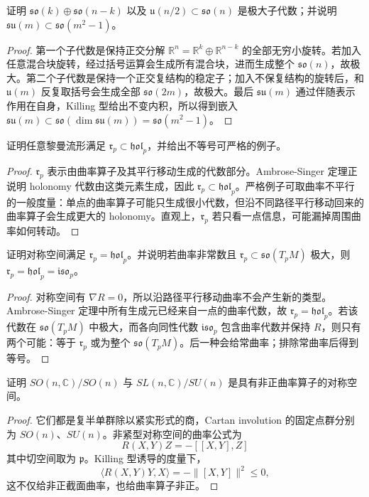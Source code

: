 \documentclass[11pt,a4paper,openany]{ctexbook}
\numberwithin{equation}{chapter}
\begin{document}
\begin{exercise}
证明 \(\mathfrak{so}(k)\oplus\mathfrak{so}(n-k)\) 以及 \(\mathfrak u(n/2)\subset\mathfrak{so}(n)\) 是极大子代数；并说明 \(\mathfrak{su}(m)\subset\mathfrak{so}(m^2-1)\)。
\end{exercise}
\begin{proof}
第一个子代数是保持正交分解 \(\mathbb R^n=\mathbb R^k\oplus\mathbb R^{n-k}\) 的全部无穷小旋转。若加入任意混合块旋转，经过括号运算会生成所有混合块，进而生成整个 \(\mathfrak{so}(n)\)，故极大。第二个子代数是保持一个正交复结构的稳定子；加入不保复结构的旋转后，和 \(\mathfrak u(m)\) 反复取括号会生成全部 \(\mathfrak{so}(2m)\)，故极大。最后 \(\mathfrak{su}(m)\) 通过伴随表示作用在自身，Killing 型给出不变内积，所以得到嵌入 \(\mathfrak{su}(m)\subset\mathfrak{so}(\dim\mathfrak{su}(m))=\mathfrak{so}(m^2-1)\)。
\end{proof}

\begin{exercise}
证明任意黎曼流形满足 \(\mathfrak r_p\subset\mathfrak{hol}_p\)，并给出不等号可严格的例子。
\end{exercise}
\begin{proof}
\(\mathfrak r_p\) 表示由曲率算子及其平行移动生成的代数部分。Ambrose-Singer 定理正说明 holonomy 代数由这类元素生成，因此 \(\mathfrak r_p\subset\mathfrak{hol}_p\)。严格例子可取曲率不平行的一般度量：单点的曲率算子可能只生成很小代数，但沿不同路径平行移动回来的曲率算子会生成更大的 holonomy。直观上，\(\mathfrak r_p\) 若只看一点信息，可能漏掉周围曲率如何转动。
\end{proof}

\begin{exercise}
证明对称空间满足 \(\mathfrak r_p=\mathfrak{hol}_p\)。并说明若曲率非常数且 \(\mathfrak r_p\subset\mathfrak{so}(T_pM)\) 极大，则 \(\mathfrak r_p=\mathfrak{hol}_p=\mathfrak{iso}_p\)。
\end{exercise}
\begin{proof}
对称空间有 \(\nabla R=0\)，所以沿路径平行移动曲率不会产生新的类型。Ambrose-Singer 定理中所有生成元已经来自一点的曲率代数，故 \(\mathfrak r_p=\mathfrak{hol}_p\)。若该代数在 \(\mathfrak{so}(T_pM)\) 中极大，而各向同性代数 \(\mathfrak{iso}_p\) 包含曲率代数并保持 \(R\)，则只有两个可能：等于 \(\mathfrak r_p\) 或为整个 \(\mathfrak{so}(T_pM)\)。后一种会给常曲率；排除常曲率后得到等号。
\end{proof}

\begin{exercise}
证明 \(SO(n,\mathbb C)/SO(n)\) 与 \(SL(n,\mathbb C)/SU(n)\) 是具有非正曲率算子的对称空间。
\end{exercise}
\begin{proof}
它们都是复半单群除以紧实形式的商，Cartan involution 的固定点群分别为 \(SO(n)\)、\(SU(n)\)。非紧型对称空间的曲率公式为
\[
R(X,Y)Z=-[[X,Y],Z]
\]
其中切空间取为 \(\mathfrak p\)。Killing 型诱导的度量下，
\[
\langle R(X,Y)Y,X\rangle=-\|[X,Y]\|^2\le0,
\]
这不仅给非正截面曲率，也给曲率算子非正。
\end{proof}
\end{document}
